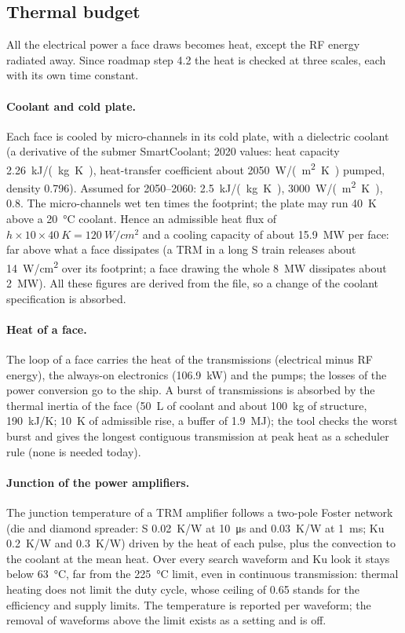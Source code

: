 \documentclass[11pt,a4paper]{article}
\begin{document}
\subsection{Thermal budget}\label{sec:thermal}
All the electrical power a face draws becomes heat, except the RF energy radiated away. Since roadmap step 4.2 the
heat is checked at three scales, each with its own time constant.

\paragraph{Coolant and cold plate.} Each face is cooled by micro-channels in its cold plate, with a dielectric coolant
(a derivative of the submer SmartCoolant; 2020 values: heat capacity \SI{2.26}{kJ/(kg.K)}, heat-transfer coefficient
about \SI{2050}{W/(m^2.K)} pumped, density 0.796). Assumed for 2050--2060: \SI{2.5}{kJ/(kg.K)},
\SI{3000}{W/(m^2.K)}, 0.8. The micro-channels wet ten times the footprint; the plate may run \SI{40}{K} above a
\SI{20}{\celsius} coolant. Hence an admissible heat flux of $h \times 10 \times \SI{40}{K} = \SI{120}{W/cm^2}$ and a
cooling capacity of about \SI{15.9}{MW} per face: far above what a face dissipates (a TRM in a long S train releases
about \SI{14}{W/cm^2} over its footprint; a face drawing the whole \SI{8}{MW} dissipates about \SI{2}{MW}). All these
figures are derived from the file, so a change of the coolant specification is absorbed.

\paragraph{Heat of a face.} The loop of a face carries the heat of the transmissions (electrical minus RF energy), the
always-on electronics (\SI{106.9}{kW}) and the pumps; the losses of the power conversion go to the ship. A burst of
transmissions is absorbed by the thermal inertia of the face (\SI{50}{L} of coolant and about \SI{100}{kg} of
structure, \SI{190}{kJ/K}; \SI{10}{K} of admissible rise, a buffer of \SI{1.9}{MJ}); the tool checks the worst burst
and gives the longest contiguous transmission at peak heat as a scheduler rule (none is needed today).

\paragraph{Junction of the power amplifiers.} The junction temperature of a TRM amplifier follows a two-pole Foster
network (die and diamond spreader: S \SI{0.02}{K/W} at \SI{10}{\micro s} and \SI{0.03}{K/W} at \SI{1}{ms}; Ku
\SI{0.2}{K/W} and \SI{0.3}{K/W}) driven by the heat of each pulse, plus the convection to the coolant at the mean heat.
Over every search waveform and Ku look it stays below \SI{63}{\celsius}, far from the \SI{225}{\celsius} limit, even in
continuous transmission: thermal heating does not limit the duty cycle, whose ceiling of 0.65 stands for the efficiency
and supply limits. The temperature is reported per waveform; the removal of waveforms above the limit exists as a
setting and is off.
\end{document}

